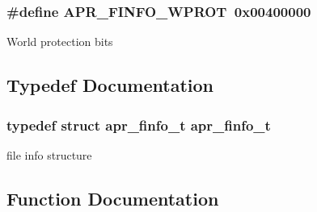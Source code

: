 \subsubsection[{\texorpdfstring{A\+P\+R\+\_\+\+F\+I\+N\+F\+O\+\_\+\+W\+P\+R\+OT}{APR_FINFO_WPROT}}]{\setlength{\rightskip}{0pt plus 5cm}\#define A\+P\+R\+\_\+\+F\+I\+N\+F\+O\+\_\+\+W\+P\+R\+OT~0x00400000}\hypertarget{group__apr__file__stat_gab970792384fe9a805cf66983350eefdc}{}\label{group__apr__file__stat_gab970792384fe9a805cf66983350eefdc}
World protection bits 

\subsection{Typedef Documentation}
\subsubsection[{\texorpdfstring{apr\+\_\+finfo\+\_\+t}{apr_finfo_t}}]{\setlength{\rightskip}{0pt plus 5cm}typedef struct {\bf apr\+\_\+finfo\+\_\+t} {\bf apr\+\_\+finfo\+\_\+t}}\hypertarget{group__apr__file__stat_ga3d390fdda1d16ae462c11b2d3b18efd1}{}\label{group__apr__file__stat_ga3d390fdda1d16ae462c11b2d3b18efd1}
file info structure 

\subsection{Function Documentation}
